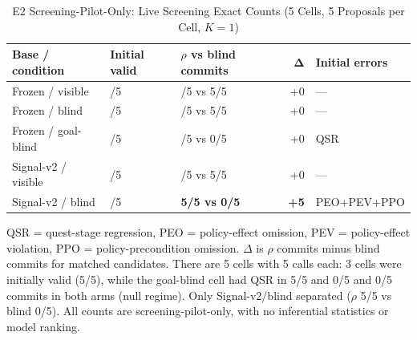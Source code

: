 \begin{table}[t]
\caption{E2 Screening-Pilot-Only: Live Screening Exact Counts (5 Cells, 5 Proposals per Cell, $K{=}1$)}
\label{tab:live-screening}
\centering\scriptsize
\setlength{\tabcolsep}{4pt}
\renewcommand{\arraystretch}{1.20}
\begin{tabularx}{\columnwidth}{@{}>{\raggedright\arraybackslash}X >{\centering\arraybackslash}p{} >{\centering\arraybackslash}p{} r >{\raggedright\arraybackslash}X@{}}
\toprule
\textbf{Base / condition} & \textbf{Initial valid} & \textbf{$\rho$ vs blind commits} & $\boldsymbol{\Delta}$ & \textbf{Initial errors} \\
\midrule
Frozen / visible & 5/5 & 5/5 vs 5/5 & +0 & --- \\
Frozen / blind & 5/5 & 5/5 vs 5/5 & +0 & --- \\
Frozen / goal-blind & 0/5 & 0/5 vs 0/5 & +0 & QSR \\
\addlinespace[2pt]
Signal-v2 / visible & 5/5 & 5/5 vs 5/5 & +0 & --- \\
Signal-v2 / blind & 0/5 & \textbf{5/5 vs 0/5} & \textbf{+5} & PEO+\allowbreak PEV+\allowbreak PPO \\
\bottomrule
\end{tabularx}
\par\vspace{3pt}\noindent\parbox{0.96\columnwidth}{\scriptsize QSR = quest-stage regression, PEO = policy-effect omission, PEV = policy-effect violation, PPO = policy-precondition omission. $\Delta$ is $\rho$ commits minus blind commits for matched candidates. There are 5 cells with 5 calls each: 3 cells were initially valid (5/5), while the goal-blind cell had QSR in 5/5 and 0/5 and 0/5 commits in both arms (null regime). Only Signal-v2/blind separated ($\rho$ 5/5 vs blind 0/5). All counts are screening-pilot-only, with no inferential statistics or model ranking.}
\end{table}
